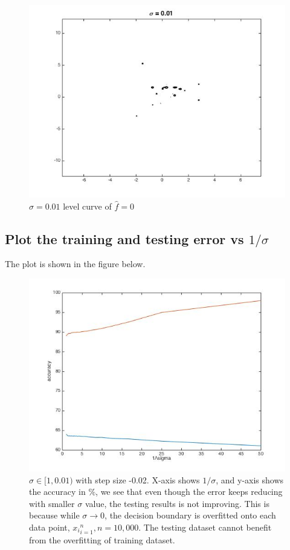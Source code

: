 \documentclass[twoside]{article}
\theoremstyle{definition}
\theoremstyle{definition}
\theoremstyle{remark}
\newcommand{\percent}{$\%$}
\begin{document}
\begin{figure}[H]
\centering
\includegraphics[width=120mm]{sigma_001_lc.jpg}
\caption{ $\sigma = 0.01$ level curve of $\hat f = 0$ \label{problem2Pic6}}
\end{figure}

\subsection{Plot the training and testing error vs $1/\sigma$}
The plot is shown in the figure below.
\begin{figure}[H]
\centering
\includegraphics[width=120mm]{training_testing_err.jpg}
\caption{ $\sigma \in [1,0.01)$ with step size -0.02. X-axis shows $1/\sigma$, and y-axis shows the accuracy in \percent, we see that even though the error keeps reducing with smaller $\sigma$ value, the testing results is not improving. This is because while $\sigma \rightarrow 0$, the decision boundary is overfitted onto each data point, ${x_i}_{i=1}^n, n = 10,000$. The testing dataset cannot benefit from the overfitting of training dataset.} 
\end{figure}
\end{document}
